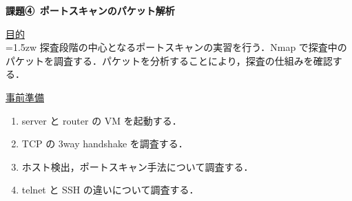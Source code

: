 



% 

\begin{center}

{\LARGE \bfseries 課題④\, ポートスキャンのパケット解析\par}

\end{center}

\vspace{1cm}

{\LARGE \uline{目的}} \\

\hangindent=1.5zw
\noindent
探査段階の中心となるポートスキャンの実習を行う．Nmap で探査中のパケットを調査する．パケットを分析することにより，探査の仕組みを確認する．

\vspace{1cm}

{\LARGE \uline{事前準備}} 

\begin{enumerate}
    \item server と router の VM を起動する．
    \item TCP の 3way handshake を調査する．
    \item ホスト検出，ポートスキャン手法について調査する．
    \item telnet と SSH の違いについて調査する．
\end{enumerate}

